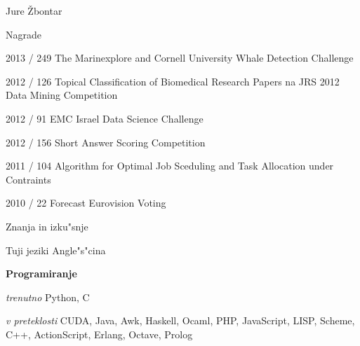 \documentclass[12pt,a4paper]{article}
\begin{document}
\begin{cv}{Jure Žbontar}
\begin{cvlist}{Nagrade}
\item[2013 \quad 5 / 249] The Marinexplore and Cornell University Whale Detection Challenge
\item[2012 \quad 1 / 126] Topical Classification of Biomedical Research Papers na JRS 2012 Data Mining Competition
\item[2012 \quad 2 / 91] EMC Israel Data Science Challenge
\item[2012 \quad 3 / 156] Short Answer Scoring Competition
\item[2011 \quad 1 / 104] Algorithm for Optimal Job Sceduling and Task Allocation under Contraints
\item[2010 \quad 1 / 22] Forecast Eurovision Voting
\end{cvlist}

\begin{cvlist}{Znanja in izku"snje}
\item[Tuji jeziki] {Angle"s"cina}
\item[\hspace{1cm}\textbf{Programiranje}] {}
\item[\textit{trenutno}]{Python, C}
\item[\textit{v preteklosti}]{CUDA, Java, Awk, Haskell, Ocaml, PHP, JavaScript, LISP,
Scheme, C++, ActionScript, Erlang, Octave, Prolog}
\end{cvlist}
\vfill

\end{cv}
\end{document}
